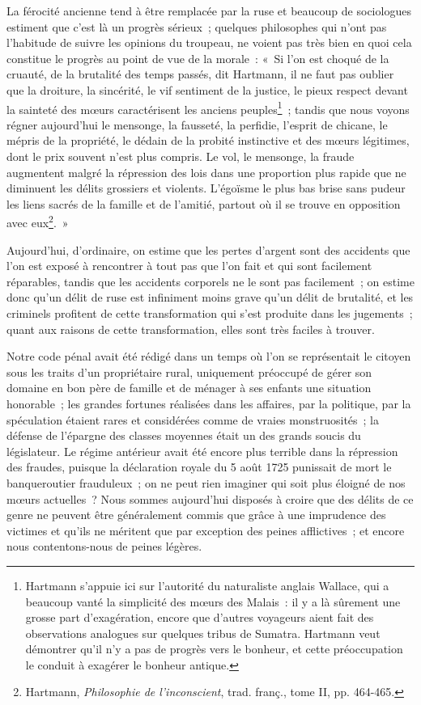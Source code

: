 \documentclass[french,twoside]{book} %
\begin{document}
La férocité ancienne tend à être remplacée par la ruse et beaucoup de sociologues estiment que c’est là un progrès sérieux ; quelques philosophes qui n’ont pas l’habitude de suivre les opinions du troupeau, ne voient pas très bien en quoi cela constitue le progrès au point de vue de la morale : « Si l’on est choqué de la cruauté, de la brutalité des temps passés, dit Hartmann, il ne faut pas oublier que la droiture, la sincérité, le vif sentiment de la justice, le pieux respect devant la sainteté des mœurs caractérisent les anciens peuples\footnote{ \noindent Hartmann s’appuie ici sur l’autorité du naturaliste anglais Wallace, qui a beaucoup vanté la simplicité des mœurs des Malais : il y a là sûrement une grosse part d’exagération, encore que d’autres voyageurs aient fait des observations analogues sur quelques tribus de Sumatra. Hartmann veut démontrer qu’il n’y a pas de progrès vers le bonheur, et cette préoccupation le conduit à exagérer le bonheur antique.
 } ; tandis que nous voyons régner aujourd’hui le mensonge, la fausseté, la perfidie, l’esprit de chicane, le mépris de la propriété, le dédain de la probité instinctive et des mœurs légitimes, dont le prix souvent n’est plus compris. Le vol, le mensonge,  la fraude augmentent malgré la répression des lois dans une proportion plus rapide que ne diminuent les délits grossiers et violents. L’égoïsme le plus bas brise sans pudeur les liens sacrés de la famille et de l’amitié, partout où il se trouve en opposition avec eux\footnote{ \noindent Hartmann, \emph{Philosophie de l’inconscient}, trad. franç., tome II, pp. 464-465.
 }. »\par
Aujourd’hui, d’ordinaire, on estime que les pertes d’argent sont des accidents que l’on est exposé à rencontrer à tout pas que l’on fait et qui sont facilement réparables, tandis que les accidents corporels ne le sont pas facilement ; on estime donc qu’un délit de ruse est infiniment moins grave qu’un délit de brutalité, et les criminels profitent de cette transformation qui s’est produite dans les jugements ; quant aux raisons de cette transformation, elles sont très faciles à trouver.\par
Notre code pénal avait été rédigé dans un temps où l’on se représentait le citoyen sous les traits d’un propriétaire rural, uniquement préoccupé de gérer son domaine en bon père de famille et de ménager à ses enfants une situation honorable ; les grandes fortunes réalisées dans les affaires, par la politique, par la spéculation étaient rares et considérées comme de vraies monstruosités ; la défense de l’épargne des classes moyennes était un des grands soucis du législateur. Le régime antérieur avait été encore plus terrible dans la répression des fraudes, puisque la déclaration royale du 5 août 1725 punissait de mort le banqueroutier frauduleux ; on ne peut rien imaginer qui soit plus éloigné de nos mœurs actuelles ? Nous sommes aujourd’hui disposés à croire  que des délits de ce genre ne peuvent être généralement commis que grâce à une imprudence des victimes et qu’ils ne méritent que par exception des peines afflictives ; et encore nous contentons-nous de peines légères.\par
\end{document}

